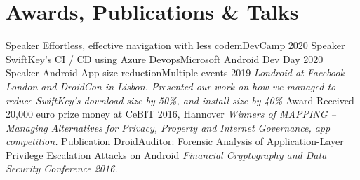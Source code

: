 \documentclass[]{friggeri-cv}
\begin{document}
\section{Awards, Publications \& Talks}
	\begin{entrylist}
        \entry
            {Speaker}
            {Effortless, effective navigation with less code}{mDevCamp 2020}
            {}
        \entry
            {Speaker}
            {SwiftKey’s CI / CD using Azure Devops}{Microsoft Android Dev Day 2020}
            {}
        \entry
            {Speaker}
            {Android App size reduction}{Multiple events 2019}
            {\emph{Londroid at Facebook London and DroidCon in Lisbon. Presented our work on how we managed to reduce SwiftKey's download size by 50\%, and install size by 40\%}}
        \entry
            {Award}
            {Received 20,000 euro prize money at CeBIT 2016, Hannover}{}
            {\emph{Winners of MAPPING -- Managing Alternatives for Privacy, Property and Internet Governance, app competition.}}
        \entry
            {Publication}
            {DroidAuditor: Forensic Analysis of Application-Layer Privilege Escalation Attacks on Android}{}
            {\emph{Financial Cryptography and Data Security Conference 2016.}}        
	\end{entrylist}
\end{document}
